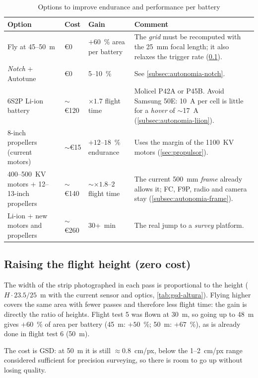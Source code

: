 \begin{table}[H]
    \centering
    \caption{Options to improve endurance and performance per battery}
    \label{tab:opcions-autonomia}
    \small
    \begin{tabular}{P{3.4cm}P{1.7cm}P{2.5cm}P{5.9cm}}
        \toprule
        Option & Cost & Gain & Comment \\
        \midrule
        Fly at 45--50~m & €0 & $+60$~\% area per battery & The \emph{grid} must be recomputed with the 25~mm focal length; it also relaxes the trigger rate (\cref{subsec:autonomia-altura}). \\
        \emph{Notch} + Autotune & €0 & 5--10~\% & See \cref{subsec:autonomia-notch}. \\
        6S2P Li-ion battery & $\sim$€120 & $\times 1.7$ flight time & Molicel P42A or P45B. Avoid Samsung 50E: 10~A per cell is little for a \emph{hover} of $\sim$17~A (\cref{subsec:autonomia-liion}). \\
        8-inch propellers (current motors) & $\sim$€15 & $+12$--$18$~\% endurance & Uses the margin of the 1100~KV motors (\cref{sec:propulsor}). \\
        400--500~KV motors + 12--13-inch propellers & $\sim$€140 & $\sim\times 1.8$--$2$ flight time & The current 500~mm \emph{frame} already allows it; FC, F9P, radio and camera stay (\cref{subsec:autonomia-frame}). \\
        Li-ion + new motors and propellers & $\sim$€260 & 30+~min & The real jump to a \emph{survey} platform. \\
        \bottomrule
    \end{tabular}
\end{table}

\subsection{Raising the flight height (zero cost)}
\label{subsec:autonomia-altura}

The width of the strip photographed in each pass is proportional to the height ($H \cdot 23.5/25$~m with the current sensor and optics, \cref{tab:gsd-altura}). Flying higher covers the same area with fewer passes and therefore less flight time: the gain is directly the ratio of heights. Flight test 5 was flown at 30~m, so going up to 48~m gives $+60$~\% of area per battery (45~m: $+50$~\%; 50~m: $+67$~\%), as is already done in flight test 6 (50~m).

The cost is GSD: at 50~m it is still $\approx 0.8$~cm/px, below the 1--2~cm/px range considered sufficient for precision surveying, so there is room to go up without losing quality.

